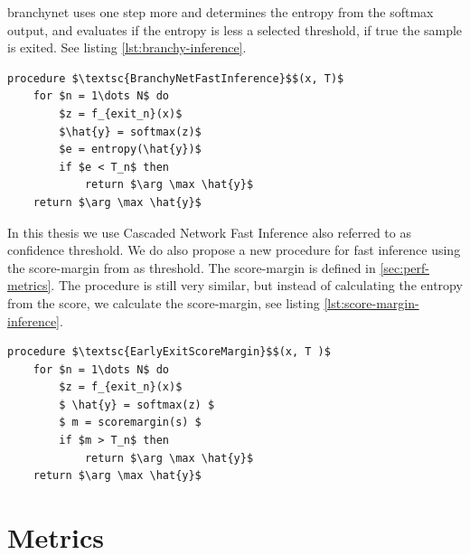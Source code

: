 \gls{branchynet} uses one step more and determines the entropy from the softmax output, and evaluates if the entropy is less a selected threshold, if true the sample is exited. See listing \ref{lst:branchy-inference}.

\begin{minipage}{\linewidth}
\begin{lstlisting}[language = {}, mathescape=true, caption={BranchyNet Fast Inference}, label={lst:branchy-inference}]
procedure $\textsc{BranchyNetFastInference}$$(x, T)$
	for $n = 1\dots N$ do
		$z = f_{exit_n}(x)$
	 	$\hat{y} = softmax(z)$
		$e = entropy(\hat{y})$
		if $e < T_n$ then
	 		return $\arg \max \hat{y}$
	return $\arg \max \hat{y}$ 
\end{lstlisting}
\end{minipage}
In this thesis we use Cascaded Network Fast Inference also referred to as confidence threshold. We do also propose a new procedure for fast inference using the score-margin from \cite{park_big/little_2015} as threshold. The score-margin is defined in \ref{sec:perf-metrics}. The procedure is still very similar, but instead of calculating the entropy from the score, we calculate the score-margin, see listing \ref{lst:score-margin-inference}.

\begin{minipage}{\linewidth}
\begin{lstlisting}[language = {}, mathescape=true, caption={Early Exit using Score-margin }, label={lst:score-margin-inference}]
procedure $\textsc{EarlyExitScoreMargin}$$(x, T )$
	for $n = 1\dots N$ do
		$z = f_{exit_n}(x)$
		$ \hat{y} = softmax(z) $
		$ m = scoremargin(s) $
		if $m > T_n$ then
			return $\arg \max \hat{y}$
	return $\arg \max \hat{y}$ 
\end{lstlisting}
\end{minipage}

\section{Metrics}

